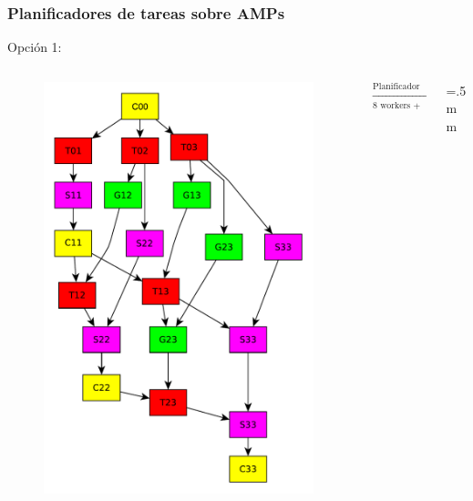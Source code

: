 \documentclass[10pt]{beamer}
\begin{document}
\begin{frame}
  \frametitle{Planificadores de tareas sobre AMPs}
  {\footnotesize Opción 1:}

  \begin{columns}[c]%
    \begin{column}{0.3\textwidth}
      \begin{figure}[tbh!]
        \begin{center}
          \includegraphics[scale=0.12]{Figures/4x4_TaskExample}
        \end{center}
      \end{figure}
    \end{column}
    \begin{column}{0.2\textwidth}
      $\xrightarrow[\text{8 workers + Biblioteca Sec.}]{\text{Planificador Ad-hoc}}$
    \end{column}
    \begin{column}{0.4\textwidth}
      \centering
      \fboxsep=1mm \fboxrule=.5mm


\end{column}
\end{columns}
\end{frame}
\end{document}
